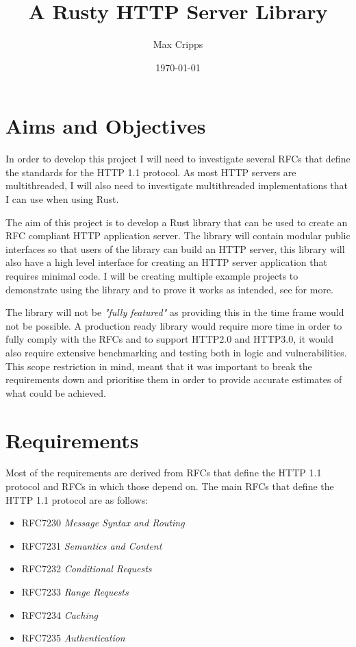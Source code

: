 \documentclass[12pt, a4paper]{article}
\title{A Rusty HTTP Server Library}
\author{Max Cripps}
\date{\today}
\begin{document}
\maketitle \newpage

\tableofcontents \newpage

\section{Aims and Objectives}

In order to develop this project I will need to investigate several RFCs that define the standards
for the HTTP 1.1 protocol. As most HTTP servers are multithreaded, I will also need to investigate
multithreaded implementations that I can use when using Rust. 

The aim of this project is to develop a Rust library that can be used to create an RFC compliant
HTTP application server. The library will contain modular public interfaces so that users of the
library can build an HTTP server, this library will also
have a high level interface for creating an HTTP server application that requires minimal code. I will
be creating multiple example projects to demonstrate using the library and to prove it works as intended,
see \emph{} for more.

The library will not be \emph{"fully featured"} as providing this in the time frame would not be
possible. A production ready library would require more time in order to fully comply with the RFCs
and to support HTTP2.0 and HTTP3.0, it would also require extensive benchmarking and testing both in
logic and vulnerabilities. This scope restriction in mind, meant that it was important to break the
requirements down and prioritise them in order to provide accurate estimates of what could be achieved.

\section{Requirements} \label{sec:requirements}

Most of the requirements are derived from RFCs that define the HTTP 1.1 protocol and RFCs in which
those depend on. The main RFCs that define the HTTP 1.1 protocol are as follows:
\begin{itemize}
  \item RFC7230 \emph{Message Syntax and Routing}
  \item RFC7231 \emph{Semantics and Content}
  \item RFC7232 \emph{Conditional Requests}
  \item RFC7233 \emph{Range Requests}
  \item RFC7234 \emph{Caching}
  \item RFC7235 \emph{Authentication}
\end{itemize}
\end{document}

